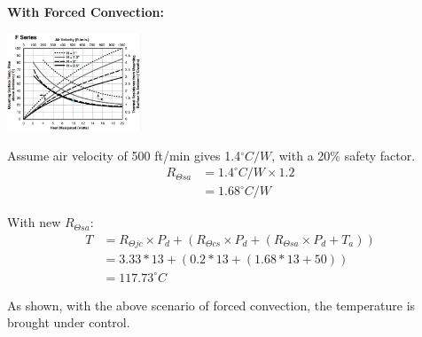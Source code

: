 \documentclass[11pt]{article}
\newcommand{\Newpage}{\end{preview}\begin{preview}}
\begin{document}
\begin{preview}
\begin{enumerate}[label=\alph*)]
          \textbf{With Forced Convection:}

          \begin{center}
            \includegraphics[width=0.3\textwidth]{F_series_heatsink_forces.png}
          \end{center}

          Assume air velocity of 500 ft/min gives 1.4$^{\circ}C/W$, with a 20\% safety factor. 
          \begin{align*}
          R_{\Theta sa} &= 1.4^{\circ}C/W \times 1.2 \\
          &=1.68^{\circ}C/W
          \end{align*}

          With new $R_{\Theta sa}$:
          \begin{align*}
            T &= R_{\Theta jc} \times P_{d} + (R_{\Theta cs} \times P_{d} + (R_{\Theta sa} \times P_{d} + T_{a})) \\
            &= 3.33*13+(0.2*13+(1.68*13+50)) \\
            &= 117.73^{\circ}C
          \end{align*}

          As shown, with the above scenario of forced convection, the temperature is brought under control.

\end{enumerate}

\Newpage

\end{preview}
\end{document}

